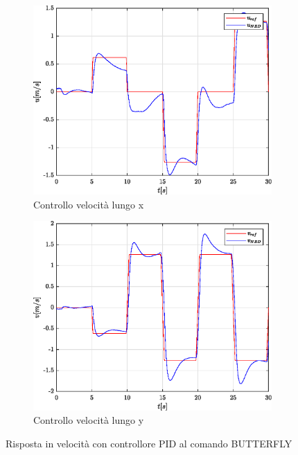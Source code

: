 \begin{figure}
	\centering
	\begin{subfigure}{0.45\textwidth}
		\centering
		\includegraphics[width=1\textwidth]{Simulazioni/Figure/PID/BUTTERFLY/PositionControlXVel}
		\caption{Controllo velocità lungo x}
		\label{fig:BUTTERFLYerrvelxPID}
	\end{subfigure}
	\hfill
	\begin{subfigure}{0.45\textwidth}
		\centering
		\includegraphics[width=1\textwidth]{Simulazioni/Figure/PID/BUTTERFLY/PositionControlYVel}
		\caption{Controllo velocità lungo y}
		\label{fig:BUTTERFLYerrvelyPID}
	\end{subfigure}
		\caption{Risposta in velocità con controllore PID al comando BUTTERFLY}
\end{figure}

